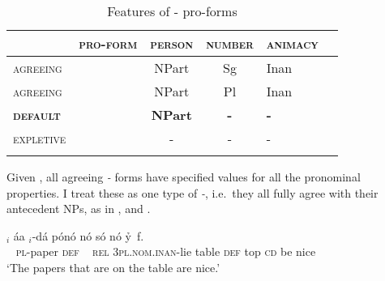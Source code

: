 \documentclass[output=paper]{LSP/langsci}
\begin{document}
\begin{table}[h]
 	\caption{Features of \textit{\eer}- pro-forms}
 	\label{tab:korsah:2}
 	\centering
 	\begin{tabular}{lccc p{2cm} c}
  \lsptoprule
 		
 		&\textsc{pro-form}& \textsc{person} & \textsc{number}  & \textsc{animacy}   \\
 		\hline
 		\textsc{agreeing} &\eer & NPart & Sg & Inan  \\
 		\textsc{agreeing}&	\eer & NPart & Pl  & Inan \\
 		
 		\textbf{\textsc{default}}&	\textbf{\eer}&	\textbf{NPart} 	&	\textbf{-} & 	\textbf{-}  \\
 		
 		\textsc{expletive}& 	\eer& - 	&- & -   \\
 	 \lsptoprule
 		
 	\end{tabular}
 	
 \end{table}
 
 


  
Given , all agreeing \textit{\eer-} forms have specified values for all the pronominal properties. I treat these as one type of \textit{\eer-}, i.e.\ they all fully agree with their antecedent NPs, as in , and .
  
\ea\label{ex:korsah:23} 
\gll [ N-k{\'{r}}ata{\'{a}} n{\'{o}} ]$_i$  {\'{a}}a  \eer$_i$-d{\'{a}} p{\'{o}}n{\'{o}} n{\'{o}} s{\'{o}}  n{\'{o}} y\h \eer \, f\eer.\\
~ \textsc{pl-}paper  \textsc{def} ~ \textsc{rel} \textsc{3pl.nom.inan}-lie table \textsc{def} top \textsc{cd} be nice \\
\glt  `The papers that are on the table are nice.'

\z
\end{document}

